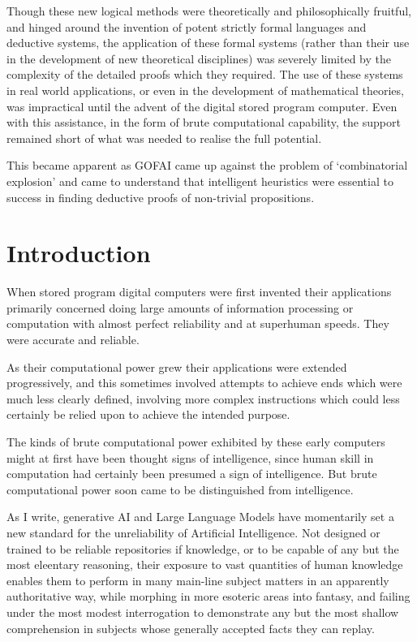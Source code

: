 \documentclass[10pt,titlepage]{book}
\begin{document}
Though these new logical methods were theoretically and philosophically fruitful, and hinged around the invention of potent strictly formal languages and deductive systems, the application of these formal systems (rather than their use in the development of new theoretical disciplines) was severely limited by the complexity of the detailed proofs which they required.
The use of these systems in real world applications, or even in the development of mathematical theories, was impractical until the advent of the digital stored program computer.
Even with this assistance, in the form of brute computational capability, the support remained short of what was needed to realise the full potential.

This became apparent as GOFAI came up against the problem of `combinatorial explosion' and came to understand that intelligent heuristics were essential to success in finding deductive proofs of non-trivial propositions.

\section{Introduction}

When stored program digital computers were first invented their applications primarily concerned doing large amounts of information processing or computation with almost perfect reliability and at superhuman speeds.
They were accurate and reliable.

As their computational power grew their applications were extended progressively, and this sometimes involved attempts to achieve ends which were much less clearly defined, involving more complex instructions which could less certainly be relied upon to achieve the intended purpose.

The kinds of brute computational power exhibited by these early computers might at first have been thought signs of intelligence, since human skill in computation had certainly been presumed a sign of intelligence.
But brute computational power soon came to be distinguished from intelligence.

As I write, generative AI and Large Language Models have momentarily set a new standard for the unreliability of Artificial Intelligence.
Not designed or trained to be reliable repositories if knowledge, or to be capable of any but the most eleentary reasoning, their exposure to vast quantities of human knowledge enables them to perform in many main-line subject matters in an apparently authoritative way, while morphing in more esoteric areas into fantasy, and failing under the most modest interrogation to demonstrate any but the most shallow comprehension in subjects whose generally accepted facts they can replay.
\end{document}
